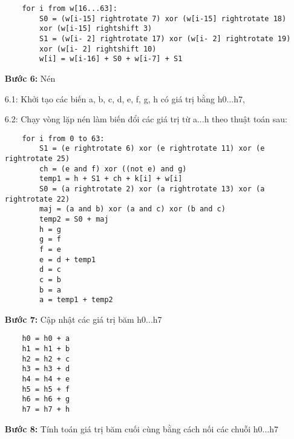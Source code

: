 \begin{itemize}
\begin{mybox}
    \begin{lstlisting}
    for i from w[16...63]:
        S0 = (w[i-15] rightrotate 7) xor (w[i-15] rightrotate 18)
        xor (w[i-15] rightshift 3)
        S1 = (w[i- 2] rightrotate 17) xor (w[i- 2] rightrotate 19)
        xor (w[i- 2] rightshift 10)
        w[i] = w[i-16] + S0 + w[i-7] + S1
    \end{lstlisting}
\end{mybox}
    \item[\textbf{Bước 6:}] Nén
    \item[6.1:] Khởi tạo các biến a, b, c, d, e, f, g, h có giá trị bằng h0...h7,
    \item[6.2:] Chạy vòng lặp nén làm biến đổi các giá trị từ a...h theo thuật toán sau:
\begin{mybox}
    \begin{lstlisting}
    for i from 0 to 63:
        S1 = (e rightrotate 6) xor (e rightrotate 11) xor (e rightrotate 25)
        ch = (e and f) xor ((not e) and g)
        temp1 = h + S1 + ch + k[i] + w[i]
        S0 = (a rightrotate 2) xor (a rightrotate 13) xor (a rightrotate 22)
        maj = (a and b) xor (a and c) xor (b and c)
        temp2 = S0 + maj
        h = g
        g = f
        f = e
        e = d + temp1
        d = c
        c = b
        b = a
        a = temp1 + temp2
    \end{lstlisting}
\end{mybox}
    \item[\textbf{Bước 7:}] Cập nhật các giá trị băm h0...h7
\begin{mybox}
    \begin{lstlisting}
    h0 = h0 + a
    h1 = h1 + b
    h2 = h2 + c
    h3 = h3 + d
    h4 = h4 + e
    h5 = h5 + f
    h6 = h6 + g
    h7 = h7 + h
    \end{lstlisting}
\end{mybox}
\item[\textbf{Bước 8:}] Tính toán giá trị băm cuối cùng bằng cách nối các chuỗi h0...h7
\end{itemize}


